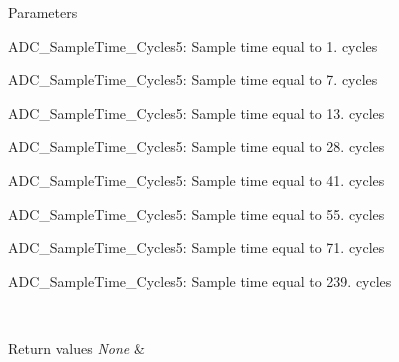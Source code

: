 \begin{DoxyParams}{Parameters}
\begin{DoxyItemize}
\item A\-D\-C\-\_\-\-Sample\-Time\-\_\-Cycles5\-: Sample time equal to 1. cycles \item A\-D\-C\-\_\-\-Sample\-Time\-\_\-Cycles5\-: Sample time equal to 7. cycles \item A\-D\-C\-\_\-\-Sample\-Time\-\_\-Cycles5\-: Sample time equal to 13. cycles \item A\-D\-C\-\_\-\-Sample\-Time\-\_\-Cycles5\-: Sample time equal to 28. cycles \item A\-D\-C\-\_\-\-Sample\-Time\-\_\-Cycles5\-: Sample time equal to 41. cycles \item A\-D\-C\-\_\-\-Sample\-Time\-\_\-Cycles5\-: Sample time equal to 55. cycles \item A\-D\-C\-\_\-\-Sample\-Time\-\_\-Cycles5\-: Sample time equal to 71. cycles \item A\-D\-C\-\_\-\-Sample\-Time\-\_\-Cycles5\-: Sample time equal to 239. cycles \end{DoxyItemize}
\\
\hline
\end{DoxyParams}

\begin{DoxyRetVals}{Return values}
{\em None} & \\
\hline
\end{DoxyRetVals}

